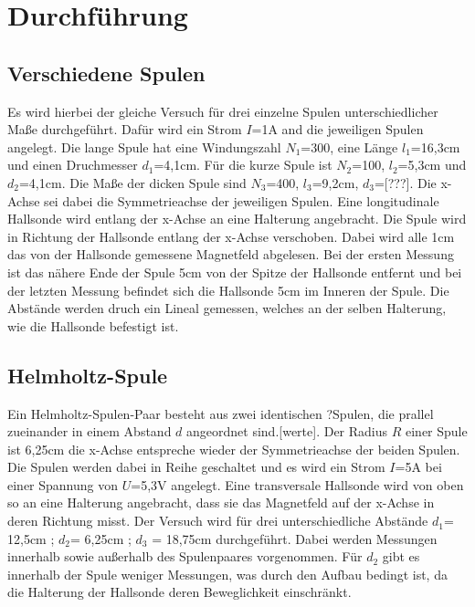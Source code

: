 \section{Durchführung}
\label{sec:Durchführung}

    \subsection{Verschiedene Spulen}

        Es wird hierbei der gleiche Versuch für drei einzelne Spulen 
        unterschiedlicher Maße durchgeführt. Dafür wird ein Strom $I$=1\si{\ampere}
        and die jeweiligen Spulen angelegt. Die lange Spule hat eine 
        Windungszahl $N_1$=300, eine Länge $l_1$=16,3\si{\centi\meter} und 
        einen Druchmesser $d_1$=4,1\si{\centi\meter}. Für die kurze Spule ist 
        $N_2$=100, $l_2$=5,3\si{\centi\meter} und $d_2$=4,1\si{\centi\meter}.
        Die Maße der dicken Spule sind $N_3$=400, $l_3$=9,2\si{\centi\meter},
        $d_3$=[???]. Die x-Achse sei dabei die Symmetrieachse 
        der jeweiligen Spulen. Eine longitudinale Hallsonde wird entlang der x-Achse
        an eine Halterung angebracht. Die Spule wird in Richtung der Hallsonde
        entlang der x-Achse verschoben. Dabei wird alle 1\si{\centi\meter} das von 
        der Hallsonde gemessene Magnetfeld abgelesen. Bei der ersten Messung ist das nähere 
        Ende der Spule 5\si{\centi\meter} von der Spitze der Hallsonde entfernt und bei 
        der letzten Messung befindet sich die Hallsonde 5\si{\centi\meter} im Inneren
        der Spule. Die Abstände werden druch ein Lineal gemessen, welches an der selben
        Halterung, wie die Hallsonde befestigt ist.

    \subsection{Helmholtz-Spule}
        
        Ein Helmholtz-Spulen-Paar besteht aus zwei identischen ?Spulen, die prallel zueinander
        in einem Abstand $d$ angeordnet sind.[werte]. Der Radius $R$ einer Spule ist 6,25\si{\centi\meter}
        die x-Achse entspreche wieder der Symmetrieachse der beiden Spulen. Die Spulen werden dabei in
        Reihe geschaltet und es wird ein Strom $I$=5\si{\ampere} bei einer Spannung von $U$=5,3\si{\volt}
        angelegt. Eine transversale Hallsonde wird von oben so an eine Halterung angebracht, 
        dass sie das Magnetfeld auf 
        der x-Achse in deren Richtung misst. Der Versuch wird für drei unterschiedliche 
        Abstände $d_1$= 12,5\si{\centi\meter} ; $d_2$= 6,25\si{\centi\meter} ; 
        $d_3$ = 18,75\si{\centi\meter} durchgeführt. Dabei werden Messungen innerhalb sowie außerhalb 
        des Spulenpaares vorgenommen. Für $d_2$ gibt es innerhalb der Spule weniger Messungen, was
        durch den Aufbau bedingt ist, da die Halterung der Hallsonde deren Beweglichkeit einschränkt.

